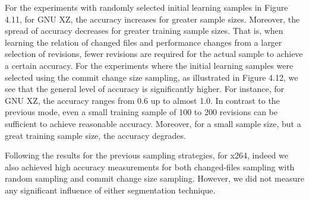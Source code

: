 For the experiments with randomly selected initial learning samples in Figure
4.11, for GNU XZ, the accuracy increases for greater sample sizes. Moreover,
the spread of accuracy decreases for greater training sample sizes. That is,
when learning the relation of changed files and performance changes from a
larger selection of revisions, fewer revisions are required for the actual
sample to achieve a certain accuracy. For the experiments where the initial
learning samples were selected using the commit change size sampling, as
illustrated in Figure 4.12, we see that the general level of accuracy is
significantly higher. For instance, for GNU XZ, the accuracy ranges from 0.6 up
to almost 1.0. In contrast to the previous mode, even a small training sample
of 100 to 200 revisions can be sufficient to achieve reasonable accuracy.
Moreover, for a small sample size, but a great training sample size, the
accuracy degrades.

Following the results for the previous sampling strategies, for x264, indeed we
also achieved high accuracy measurements for both changed-files sampling with
random sampling and commit change size sampling. However, we did not measure
any significant influence of either segmentation technique.

